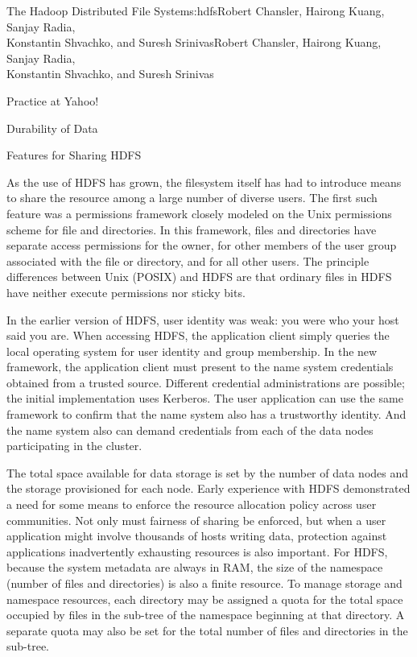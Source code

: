 \begin{aosachaptertoc}{The Hadoop Distributed File System}{s:hdfs}{Robert Chansler, Hairong Kuang, Sanjay Radia, \\ Konstantin Shvachko, and Suresh Srinivas}{Robert Chansler, Hairong Kuang, Sanjay Radia, \\ \hspace*{0.9cm} Konstantin Shvachko, and Suresh Srinivas}
\begin{aosasect1}{Practice at Yahoo!}
\begin{aosasect2}{Durability of Data}
\end{aosasect2}

\begin{aosasect2}{Features for Sharing HDFS}

As the use of HDFS has grown, the filesystem itself has had to
introduce means to share the resource among a large number of diverse users. 
The first such feature was a permissions framework closely
modeled on the Unix permissions scheme for file and directories. In
this framework, files and directories have separate access permissions
for the owner, for other members of the user group associated with the
file or directory, and for all other users. The principle differences
between Unix (POSIX) and HDFS are that ordinary files in HDFS have
neither execute permissions nor sticky bits.

In the earlier version of HDFS, user identity was weak: you were who
your host said you are. When accessing HDFS, the application client
simply queries the local operating system for user identity and group
membership. In the new framework, the application client must present
to the name system credentials obtained from a trusted
source. Different credential administrations are possible; the initial
implementation uses Kerberos.  The user application can use the same
framework to confirm that the name system also has a trustworthy
identity. And the name system also can demand credentials from each of
the data nodes participating in the cluster.

The total space available for data storage is set by the number of
data nodes and the storage provisioned for each node. Early experience
with HDFS demonstrated a need for some means to enforce the resource
allocation policy across user communities. Not only must fairness of
sharing be enforced, but when a user application might involve
thousands of hosts writing data, protection against applications
inadvertently exhausting resources is also important. For HDFS,
because the system metadata are always in RAM, the size of the
namespace (number of files and directories) is also a finite
resource. To manage storage and namespace resources, each directory
may be assigned a quota for the total space occupied by files in the
sub-tree of the namespace beginning at that directory. A separate
quota may also be set for the total number of files and directories in
the sub-tree.


\end{aosasect2}
\end{aosasect1}
\end{aosachaptertoc}
